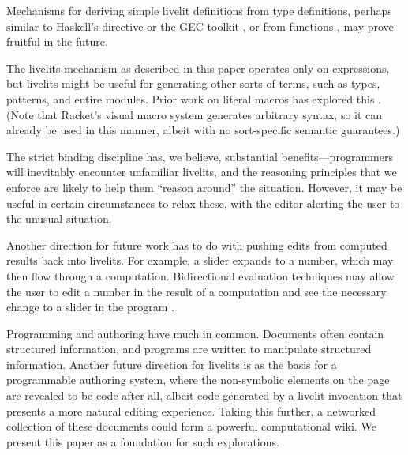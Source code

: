 Mechanisms for deriving simple 
livelit definitions from type definitions, perhaps similar to Haskell's  directive
or the GEC toolkit \cite{DBLP:conf/afp/AchtenEPW04}, or from  functions \cite{DBLP:conf/vl/HempelC20}, 
may prove fruitful in the future.

  The livelits mechanism as described in this paper operates only on expressions,
  but livelits might be useful for generating other sorts of terms, such as types,
  patterns, and entire modules. Prior work on literal macros has explored this \cite{TLMs}.
  (Note that Racket's visual macro system generates
  arbitrary syntax, so it can already be used in 
  this manner, albeit with no sort-specific semantic guarantees.)

   The strict binding discipline has, we believe, substantial 
   benefits---programmers will inevitably encounter unfamiliar livelits, and 
   the reasoning principles that we enforce are likely to help them ``reason around''
   the situation. However, it may be useful in certain circumstances to 
   relax these, with the editor alerting the user to the unusual situation.

  Another direction for future work has to do with pushing edits from computed results
  back into livelits. For example, a slider expands to a number, which may 
  then flow through a computation. Bidirectional evaluation techniques may allow
  the user to edit a number in the result of a computation and see the necessary
  change to a slider in the program \cite{sns-pldi,sns-uist}.

  Programming and authoring have much in common. Documents often contain structured
  information, and programs are written to manipulate structured information.
  Another future direction for livelits is as the basis for a programmable authoring 
  system, where the non-symbolic elements on the page are revealed to be code after all,
  albeit code generated by a livelit invocation that presents a more natural editing experience. 
  Taking this further, a networked collection of these
  documents could form a powerful computational wiki.
  We present this paper as a foundation for such explorations.

